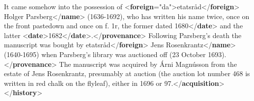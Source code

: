 \begin{shaded}
It came somehow into the possession of {<\textbf{foreign}\hspace*{1em}{xml:lang}="{da}">}etatsråd{</\textbf{foreign}>}\mbox{}\newline 
\hspace*{1em}Holger Parsberg{</\textbf{name}>} (1636-1692), who has written his name\mbox{}\newline 
\hspace*{1em}\hspace*{1em} twice, once on the front pastedown and once on f. 1r, the former dated\mbox{}\newline 
{}1680{</\textbf{date}>} and the latter {<\textbf{date}>}1682{</\textbf{date}>}.{</\textbf{provenance}>}\mbox{}\newline 
{}Following Parsberg's death the manuscript was bought by\mbox{}\newline 
{}etatsråd{</\textbf{foreign}>}\mbox{}\newline 
\hspace*{1em}Jens Rosenkrantz{</\textbf{name}>} (1640-1695) when Parsberg's library\mbox{}\newline 
\hspace*{1em}\hspace*{1em} was auctioned off (23 October 1693).{</\textbf{provenance}>}\mbox{}\newline 
{}The manuscript was acquired by\mbox{}\newline 
\hspace*{1em}\hspace*{1em} Árni Magnússon from the estate of Jens Rosenkrantz, presumably at auction (the\mbox{}\newline 
\hspace*{1em}\hspace*{1em} auction lot number 468 is written in red chalk on the flyleaf), either in 1696\mbox{}\newline 
\hspace*{1em}\hspace*{1em} or 97.{</\textbf{acquisition}>}\mbox{}\newline 
{</\textbf{history}>}\end{shaded}\egroup\par 
